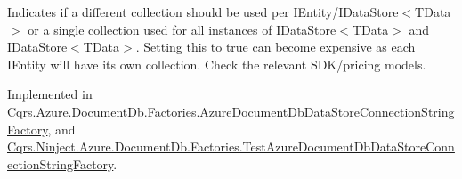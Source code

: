 Indicates if a different collection should be used per I\+Entity/I\+Data\+Store$<$\+T\+Data$>$ or a single collection used for all instances of I\+Data\+Store$<$\+T\+Data$>$ and I\+Data\+Store$<$\+T\+Data$>$. Setting this to true can become expensive as each I\+Entity will have it\textquotesingle{}s own collection. Check the relevant S\+D\+K/pricing models. 



Implemented in \hyperlink{classCqrs_1_1Azure_1_1DocumentDb_1_1Factories_1_1AzureDocumentDbDataStoreConnectionStringFactory_aa7b4b3eca609a815358af227b0f53909_aa7b4b3eca609a815358af227b0f53909}{Cqrs.\+Azure.\+Document\+Db.\+Factories.\+Azure\+Document\+Db\+Data\+Store\+Connection\+String\+Factory}, and \hyperlink{classCqrs_1_1Ninject_1_1Azure_1_1DocumentDb_1_1Factories_1_1TestAzureDocumentDbDataStoreConnectionStringFactory_aeac8ecfdbb2d1d7f18105f2e535c51fe_aeac8ecfdbb2d1d7f18105f2e535c51fe}{Cqrs.\+Ninject.\+Azure.\+Document\+Db.\+Factories.\+Test\+Azure\+Document\+Db\+Data\+Store\+Connection\+String\+Factory}.


